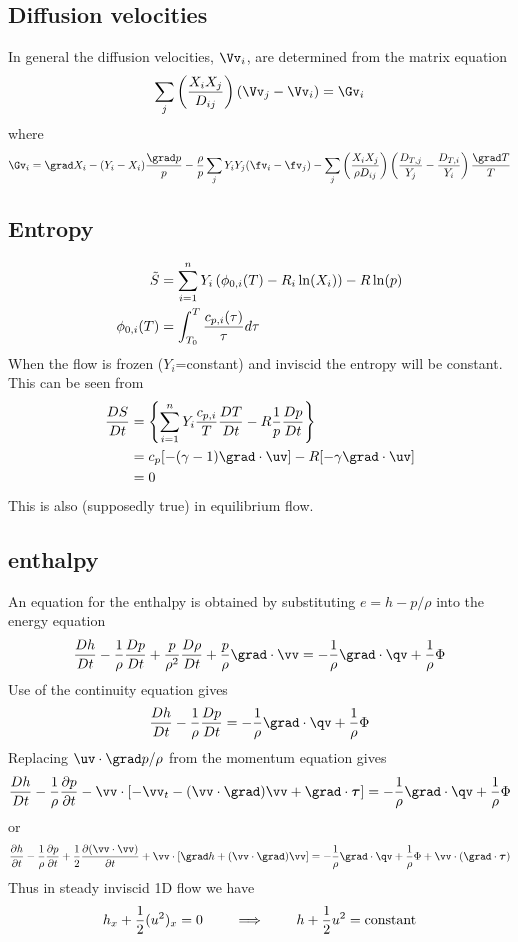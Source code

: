 \documentclass{article}
\begin{document}
\subsection{Diffusion velocities}

In general the diffusion velocities, $\Vv_i$, are determined from the matrix equation
\[
    \sum_j \left( {X_i X_j \over D_{ij} }\right) (\Vv_j-\Vv_i) = \Gv_i
\]
where
\[
   \Gv_i = \grad X_i - (Y_i-X_i){\grad p \over p} - {\rho\over p} \sum_j Y_i Y_j (\fv_i-\fv_j)
    - \sum_j\left( {X_i X_j \over \rho D_{ij}}\right)\left( {D_{T,j}\over Y_j} - {D_{T,i}\over Y_i}\right) 
      {\grad T\over T}
\]



\subsection{Entropy}
\begin{align*}
\tilde{S} &= \sum_{i=1}^n Y_i \left(\phi_{0,i} (T) -R_i \ln(X_i)\right) - R \ln(p)  \\
\phi_{0,i} (T) &= \int_{T_0}^T {c_{p,i}(\tau) \over \tau} d\tau 
\end{align*}
When the flow is frozen ($Y_i$=constant) and inviscid the entropy will be constant. This can be
seen from
\begin{align*}
{D S\over Dt} &= \left\{ \sumi Y_i {c_{p,i}\over T}{D T\over Dt}
         - R {1\over p} {D p\over Dt} \right\} \\
 &= c_p [ -(\gamma-1)\grad\cdot\uv] - R [-\gamma\grad\cdot\uv] \\
 & = 0
\end{align*}
This is also (supposedly true) in equilibrium flow.


\subsection{enthalpy}
An equation for the enthalpy is obtained by substituting $e=h-p/\rho$ into the energy equation
\[
   {D h  \over D t}  - {1\over \rho}{D p\over D t} + {p\over\rho^2}{D \rho\over D t}+ {p\over\rho}\grad\cdot\vv
           = -{1\over\rho} \grad\cdot\qv  + {1\over\rho}\Phi   
\]
Use of the continuity equation gives
\[
   {D h  \over D t}  - {1\over \rho}{D p\over D t} 
           = -{1\over\rho} \grad\cdot\qv  + {1\over\rho}\Phi  
\]
Replacing $\uv\cdot\grad p/\rho$ from the momentum equation gives
\[
   {D h  \over D t}  - {1\over \rho}{\partial p\over \partial t} 
         - \vv\cdot\left[ - \vv_t -  (\vv\cdot\grad)\vv + \Div \tauv \right]
           = -{1\over\rho} \grad\cdot\qv  + {1\over\rho}\Phi  
\]
or
\newcommand{\halfo}{{1\over2}}
\begin{equation}
   {\partial h  \over \partial t}  
  - {1\over \rho}{\partial p\over \partial t} 
  + \halfo {\partial (\vv\cdot\vv)\over \partial t}
   + \vv\cdot\left[ \grad h  +  (\vv\cdot\grad)\vv \right]
           = -{1\over\rho} \grad\cdot\qv  + {1\over\rho}\Phi  + \vv\cdot(\Div\tauv)
\end{equation}
Thus in steady inviscid 1D flow we have
\[
     h_x + \halfo (u^2)_x = 0 \qquad \implies\qquad  h+\halfo u^2 = \text{constant}
\]
\end{document}
